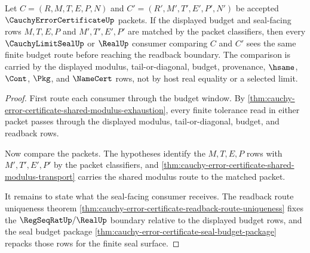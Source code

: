 \begin{theorem}
\label{thm:cauchy-error-certificate-budget-seal-comparison}
Let $C=(R,M,T,E,P,N)$ and $C'=(R',M',T',E',P',N')$ be accepted $\CauchyErrorCertificateUp$ packets. If the displayed budget and seal-facing rows $M,T,E,P$ and $M',T',E',P'$ are matched by the packet classifiers, then every $\CauchyLimitSealUp$ or $\RealUp$ consumer comparing $C$ and $C'$ sees the same finite budget route before reaching the readback boundary. The comparison is carried by the displayed modulus, tail-or-diagonal, budget, provenance, $\hsame$, $\Cont$, $\Pkg$, and $\NameCert$ rows, not by host real equality or a selected limit.
\end{theorem}
\begin{proof}
First route each consumer through the budget window. By \autoref{thm:cauchy-error-certificate-shared-modulus-exhaustion}, every finite tolerance read in either packet passes through the displayed modulus, tail-or-diagonal, budget, and readback rows.

Now compare the packets. The hypotheses identify the $M,T,E,P$ rows with $M',T',E',P'$ by the packet classifiers, and \autoref{thm:cauchy-error-certificate-shared-modulus-transport} carries the shared modulus route to the matched packet.

It remains to state what the seal-facing consumer receives. The readback route uniqueness theorem \autoref{thm:cauchy-error-certificate-readback-route-uniqueness} fixes the $\RegSeqRatUp/\RealUp$ boundary relative to the displayed budget rows, and the seal budget package \autoref{thm:cauchy-error-certificate-seal-budget-package} repacks those rows for the finite seal surface.
\end{proof}

